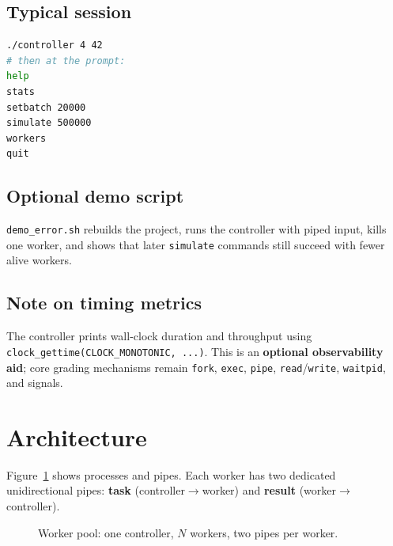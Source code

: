 \documentclass[11pt]{article}
\begin{document}
\subsection{Typical session}
\begin{lstlisting}[language=bash]
./controller 4 42
# then at the prompt:
help
stats
setbatch 20000
simulate 500000
workers
quit
\end{lstlisting}

\subsection{Optional demo script}
\texttt{demo\_error.sh} rebuilds the project, runs the controller with piped input, kills one worker, and shows that later \texttt{simulate} commands still succeed with fewer alive workers.

\subsection{Note on timing metrics}
The controller prints wall-clock duration and throughput using \texttt{clock\_gettime(CLOCK\_MONOTONIC, ...)}. This is an \textbf{optional observability aid}; core grading mechanisms remain \texttt{fork}, \texttt{exec}, \texttt{pipe}, \texttt{read}/\texttt{write}, \texttt{waitpid}, and signals.

\section{Architecture}
\label{sec:arch}

Figure~\ref{fig:arch} shows processes and pipes. Each worker has two dedicated unidirectional pipes: \textbf{task} (controller$\rightarrow$worker) and \textbf{result} (worker$\rightarrow$controller).

\begin{figure}[ht]
  \centering
  \caption{Worker pool: one controller, $N$ workers, two pipes per worker.}
  \label{fig:arch}
\end{figure}
\end{document}
